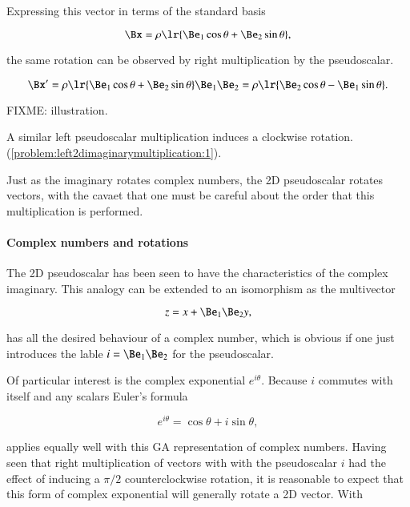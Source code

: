 Expressing this vector in terms of the standard basis

\begin{dmath}\label{eqn:SimpleProducts2:280}
   \Bx = \rho \lr{ \Be_1 \cos\theta + \Be_2 \sin\theta },
\end{dmath}

the same rotation can be observed by right multiplication by the pseudoscalar.

\begin{dmath}\label{eqn:SimpleProducts2:300}
\Bx'
= \rho \lr{ \Be_1 \cos\theta + \Be_2 \sin\theta } \Be_1 \Be_2
= \rho \lr{ \Be_2 \cos\theta - \Be_1 \sin\theta }.
\end{dmath}

FIXME: illustration.

A similar left pseudoscalar multiplication induces a clockwise rotation.
(\cref{problem:left2dimaginarymultiplication:1}).

Just as the imaginary rotates complex numbers, the 2D pseudoscalar rotates vectors, with the cavaet that one must be careful about the order that this multiplication is performed.

\paragraph{Complex numbers and rotations}

The 2D pseudoscalar has been seen to have the characteristics of the complex imaginary.  This analogy can be extended to an isomorphism as the multivector

\begin{dmath}\label{eqn:SimpleProducts2:320}
z = x + \Be_1 \Be_2 y,
\end{dmath}

has all the desired behaviour of a complex number, which is obvious if one just introduces the lable \( i = \Be_1 \Be_2 \) for the pseudoscalar.

Of particular interest is the complex exponential \( e^{i \theta} \).  Because \( i \) commutes with itself and any scalars Euler's formula

\begin{dmath}\label{eqn:SimpleProducts2:340}
e^{i \theta} = \cos\theta + i \sin\theta,
\end{dmath}

applies equally well with this GA representation of complex numbers.  Having seen that right multiplication of vectors with with the pseudoscalar \( i \) had the effect of inducing a \( \pi/2 \) counterclockwise rotation, it is reasonable to expect that this form of complex exponential will generally rotate a 2D vector.  With

